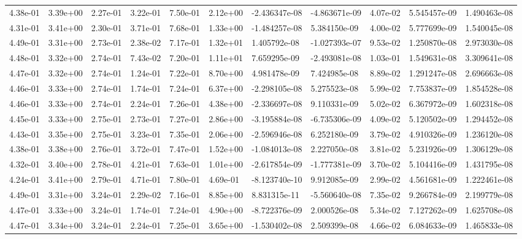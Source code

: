 \begin{longtable}{| p{} | p{} |}
4.38e-01 & 3.39e+00 & 2.27e-01 & 3.22e-01 & 7.50e-01 & 2.12e+00 & -2.436347e-08 & -4.863671e-09 &  4.07e-02 &  5.545457e-09 &  1.490463e-08 \\
4.31e-01 & 3.41e+00 & 2.30e-01 & 3.71e-01 & 7.68e-01 & 1.33e+00 & -1.484257e-08 &  5.384150e-09 &  4.00e-02 &  5.777699e-09 &  1.540045e-08 \\
4.49e-01 & 3.31e+00 & 2.73e-01 & 2.38e-02 & 7.17e-01 & 1.32e+01 &  1.405792e-08 & -1.027393e-07 &  9.53e-02 &  1.250870e-08 &  2.973030e-08 \\
4.48e-01 & 3.32e+00 & 2.74e-01 & 7.43e-02 & 7.20e-01 & 1.11e+01 &  7.659295e-09 & -2.493081e-08 &  1.03e-01 &  1.549631e-08 &  3.309641e-08 \\
4.47e-01 & 3.32e+00 & 2.74e-01 & 1.24e-01 & 7.22e-01 & 8.70e+00 &  4.981478e-09 &  7.424985e-08 &  8.89e-02 &  1.291247e-08 &  2.696663e-08 \\
4.46e-01 & 3.33e+00 & 2.74e-01 & 1.74e-01 & 7.24e-01 & 6.37e+00 & -2.298105e-08 &  5.275523e-08 &  5.99e-02 &  7.753837e-09 &  1.854528e-08 \\
4.46e-01 & 3.33e+00 & 2.74e-01 & 2.24e-01 & 7.26e-01 & 4.38e+00 & -2.336697e-08 &  9.110331e-09 &  5.02e-02 &  6.367972e-09 &  1.602318e-08 \\
4.45e-01 & 3.33e+00 & 2.75e-01 & 2.73e-01 & 7.27e-01 & 2.86e+00 & -3.195884e-08 & -6.735306e-09 &  4.09e-02 &  5.120502e-09 &  1.294452e-08 \\
4.43e-01 & 3.35e+00 & 2.75e-01 & 3.23e-01 & 7.35e-01 & 2.06e+00 & -2.596946e-08 &  6.252180e-09 &  3.79e-02 &  4.910326e-09 &  1.236120e-08 \\
4.38e-01 & 3.38e+00 & 2.76e-01 & 3.72e-01 & 7.47e-01 & 1.52e+00 & -1.084013e-08 &  2.227050e-08 &  3.81e-02 &  5.231926e-09 &  1.306129e-08 \\
4.32e-01 & 3.40e+00 & 2.78e-01 & 4.21e-01 & 7.63e-01 & 1.01e+00 & -2.617854e-09 & -1.777381e-09 &  3.70e-02 &  5.104416e-09 &  1.431795e-08 \\
4.24e-01 & 3.41e+00 & 2.79e-01 & 4.71e-01 & 7.80e-01 & 4.69e-01 & -8.123740e-10 &  9.912085e-09 &  2.99e-02 &  4.561681e-09 &  1.222461e-08 \\
4.49e-01 & 3.31e+00 & 3.24e-01 & 2.29e-02 & 7.16e-01 & 8.85e+00 &  8.831315e-11 & -5.560640e-08 &  7.35e-02 &  9.266784e-09 &  2.199779e-08 \\
4.47e-01 & 3.33e+00 & 3.24e-01 & 1.74e-01 & 7.24e-01 & 4.90e+00 & -8.722376e-09 &  2.000526e-08 &  5.34e-02 &  7.127262e-09 &  1.625708e-08 \\
4.47e-01 & 3.34e+00 & 3.24e-01 & 2.24e-01 & 7.25e-01 & 3.65e+00 & -1.530402e-08 &  2.509399e-08 &  4.66e-02 &  6.084633e-09 &  1.465833e-08 \\

\end{longtable}
